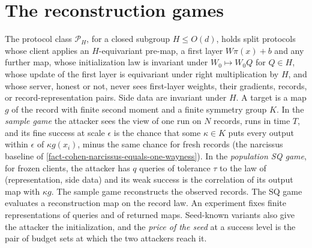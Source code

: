 \section{The reconstruction games}

\begin{definition}
The protocol class $\mathcal P_H$, for a closed subgroup $H\le O(d)$, holds split
protocols whose client applies an $H$-equivariant pre-map, a first layer
$W\pi(x)+b$ and any further map, whose initialization law is invariant under
$W_0\mapsto W_0Q$ for $Q\in H$, whose update of the first layer is equivariant
under right multiplication by $H$, and whose server, honest or not, never sees
first-layer weights, their gradients, records, or record-representation pairs.
Side data are invariant under $H$. A target is a map $g$ of the record with
finite second moment and a finite symmetry group $K$. In the \emph{sample game}
the attacker sees the view of one run on $N$ records, runs in time $T$, and its
fine success at scale $\epsilon$ is the chance that some $\kappa\in K$ puts every
output within $\epsilon$ of $\kappa g(x_i)$, minus the same chance for fresh records
(the narcissus baseline of \cref{fact-cohen-narcissus-equals-one-wayness}). In the
\emph{population SQ game}, for frozen clients, the attacker has $q$ queries of
tolerance $\tau$ to the law of (representation, side data) and its weak success is
the correlation of its output map with $\kappa g$. The sample game reconstructs the
observed records. The SQ game evaluates a reconstruction map on the record law. An
experiment fixes finite representations of queries and of returned maps.
Seed-known variants also give the attacker the initialization, and the
\emph{price of the seed} at a success level is the pair of budget sets at which
the two attackers reach it.
\end{definition}


